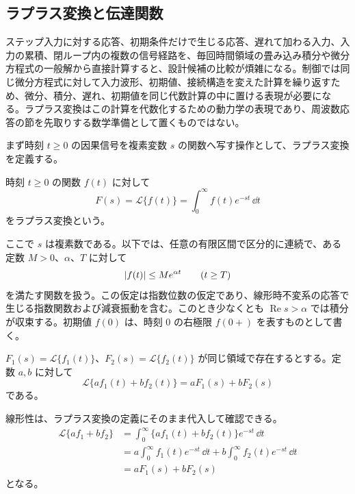 \subsection{ラプラス変換と伝達関数}

ステップ入力に対する応答、初期条件だけで生じる応答、遅れて加わる入力、入力の累積、閉ループ内の複数の信号経路を、毎回時間領域の畳み込み積分や微分方程式の一般解から直接計算すると、設計候補の比較が煩雑になる。制御では同じ微分方程式に対して入力波形、初期値、接続構造を変えた計算を繰り返すため、微分、積分、遅れ、初期値を同じ代数計算の中に置ける表現が必要になる。ラプラス変換はこの計算を代数化するための動力学の表現であり、周波数応答の節を先取りする数学準備として置くものではない。

まず時刻 $t\ge0$ の因果信号を複素変数 $s$ の関数へ写す操作として、ラプラス変換を定義する。

\begin{definition}[ラプラス変換]
時刻 $t\ge0$ の関数 $f(t)$ に対して
\begin{equation}
  F(s)=\mathcal{L}\{f(t)\}
  =\int_0^\infty f(t)e^{-st}\,\dd t
  \label{eq:laplace-definition}
\end{equation}
をラプラス変換という。
\end{definition}

ここで $s$ は複素数である。以下では、任意の有限区間で区分的に連続で、ある定数 $M>0$、$\alpha$、$T$ に対して
\begin{equation}
  \left|f(t)\right|\le M e^{\alpha t}\qquad (t\ge T)
\end{equation}
を満たす関数を扱う。この仮定は指数位数の仮定であり、線形時不変系の応答で生じる指数関数および減衰振動を含む。このとき少なくとも $\operatorname{Re}s>\alpha$ では積分が収束する。初期値 $f(0)$ は、時刻 $0$ の右極限 $f(0+)$ を表すものとして書く。

\begin{theorem}[ラプラス変換の線形性]
$F_1(s)=\mathcal{L}\{f_1(t)\}$、$F_2(s)=\mathcal{L}\{f_2(t)\}$ が同じ領域で存在するとする。定数 $a,b$ に対して
\begin{equation}
  \mathcal{L}\{a f_1(t)+b f_2(t)\}=aF_1(s)+bF_2(s)
  \label{eq:laplace-linearity}
\end{equation}
である。
\end{theorem}

線形性は、ラプラス変換の定義にそのまま代入して確認できる。
\begin{align}
  \mathcal{L}\{a f_1+b f_2\}
  &=\int_0^\infty \{a f_1(t)+b f_2(t)\}e^{-st}\,\dd t\\
  &=a\int_0^\infty f_1(t)e^{-st}\,\dd t
    +b\int_0^\infty f_2(t)e^{-st}\,\dd t\\
  &=aF_1(s)+bF_2(s)
\end{align}
となる。

